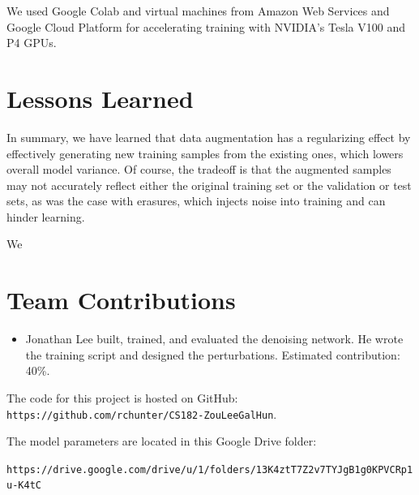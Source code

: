 \documentclass[justified]{article}
\begin{document}
  We used Google Colab and virtual machines from Amazon Web Services and Google Cloud Platform for accelerating training with NVIDIA's Tesla V100 and P4 GPUs.

  \section{Lessons Learned}

  In summary, we have learned that data augmentation has a regularizing effect by effectively generating new training samples from the existing ones, which lowers overall model variance.
  Of course, the tradeoff is that the augmented samples may not accurately reflect either the original training set or the validation or test sets, as was the case with erasures, which injects noise into training and can hinder learning.

  We


  \section{Team Contributions}

  \begin{itemize}
  \item
    Jonathan Lee built, trained, and evaluated the denoising network.
    He wrote the training script and designed the perturbations.
    Estimated contribution: 40\%.
  \end{itemize}

  The code for this project is hosted on GitHub: \texttt{https://github.com/rchunter/CS182-ZouLeeGalHun}.

  The model parameters are located in this Google Drive folder:

  \texttt{https://drive.google.com/drive/u/1/folders/13K4ztT7Z2v7TYJgB1g0KPVCRp1u-K4tC}

  
  
\end{document}

